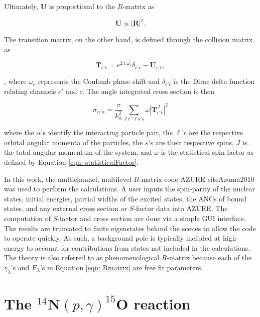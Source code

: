 \noindent Ultimately, $\mathbf{U}$ is proportional to the $R$-matrix as

\begin{equation}
\mathbf{U} \propto | \mathbf{R} |^{2}.
\end{equation}

\noindent The transition matrix, on the other hand, is defined through the collision matrix as 

\begin{equation}
\mathbf{T}_{c' c} = e^{2\imath \omega_{c}} \delta_{c' c} - \mathbf{U}_{c' c},
\end{equation}

\noindent, where $\omega_{c}$ represents the Coulomb phase shift and $\delta_{c' c}$ is the Dirac delta function relating channels $c'$ and $c$. The angle integrated cross section is then 

\begin{equation}
\sigma_{\alpha' \alpha} = \dfrac{\pi}{k_{\alpha}^{2}} \sum_{J \ell' \ell s' s} \omega | \mathbf{T}_{c' c}^{J} |^{2}
\end{equation}

\noindent where the $\alpha$'s identify the interacting particle pair, the $\ell$'s are the respective orbital angular momenta of the particles, the $s$'s are their respective spins, $J$ is the total angular momentum of the system, and $\omega$ is the statistical spin factor as defined by Equation \ref{eqn: statisticalFactor}. 

In this work, the multichannel, multilevel $R$-matrix code AZURE cite{Azuma2010} was used to perform the calculations. A user inputs the spin-parity of the nuclear states, initial energies, partial widths of the excited states, the ANCs of bound states, and any external cross section or $S$-factor data into AZURE. The computation of $S$-factor and cross section are done via a simple GUI interface. The results are truncated to finite eigenstates behind the scenes to allow the code to operate quickly. As such, a background pole is typically included at high-energy to account for contributions from states not included in the calculations. The theory is also referred to as phenomenological $R$-matrix because each of the $\gamma_{\lambda}$'s and $E_{\lambda}$'s in Equation \ref{eqn: Rmatrix} are free fit parameters. 





\section{The $^{14}$N$\left( p,\gamma \right) ^{15}$O reaction}
\label{sec: 14N(p,g)}


